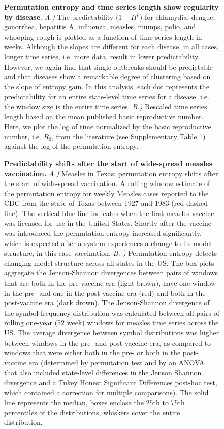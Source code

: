 \documentclass[fleqn,12pt]{wlscirep}
\begin{document}
\begin{figure}[H]
	\centering 
	\caption{\label{fig:bigrambo}\textbf{Permutation entropy and time series length show regularity by disease}.  \textit{A.)} The predictability ($1 - H^p$) for chlamydia, dengue, gonorrhea, hepatitis A, influenza, measles, mumps, polio, and whooping cough is plotted as a function of time series length in weeks.  Although the slopes are different for each disease, in all cases, longer time series, i.e. more data, result in lower predictability.  However, we again find that single outbreaks should be predictable and that diseases show a remarkable degree of clustering based on the slope of entropy gain. In this analysis, each dot represents the predictability for an entire state-level time series for a disease, i.e. the window size is the entire time series. \textit{B.)} Rescaled  time series length based on the mean published basic reproductive number.  Here, we plot the log of time normalized by the basic reproductive number, i.e. $R_0$, from the literature (see Supplementary Table 1) against the log of the permutation entropy.}
\end{figure}

\begin{figure}[H]
	\centering
	\caption{\label{fig:vaccent}
		\textbf{Predictability shifts after the start of wide-spread measles vaccination.} \textit{A.)} Measles in Texas: permutation entropy shifts after the start of wide-spread vaccination. A rolling window estimate of the permutation entropy for weekly Measles cases reported to the CDC from the state of Texas between 1927 and 1983 (red dashed line).  The vertical blue line indicates when the first measles vaccine was licensed for use in the United States.  Shortly after the vaccine was introduced the permutation entropy increased significantly, which is expected after a system experiences a change to its model structure, in this case vaccination.
		\textit{B. )} Permutation entropy detects changing model structure across all states in the US. The box-plots aggregate the Jenson-Shannon divergences between pairs of windows that are both in the pre-vaccine era (light brown), have one window in the pre- and one in the post-vaccine era (red) and both in the post-vaccine era (dark drown). The Jenson-Shannon divergence of the symbol frequency distribution was calculated between all pairs of rolling one-year (52 week) windows for measles time series across the US. The average divergence between symbol distributions was higher between windows in the pre- and post-vaccine era, as compared to windows that were either both in the pre- or both in the post-vaccine era (determined by permutation test and by an ANOVA that also included state-level differences in the Jenson Shannon divergence and a Tukey Honest Significant Differences post-hoc test, which contained a correction for multiple comparisons). The solid line represents the median, boxes enclose the 25th to 75th percentiles of the distributions, whiskers cover the entire distribution. 
	}
\end{figure}
\end{document}
